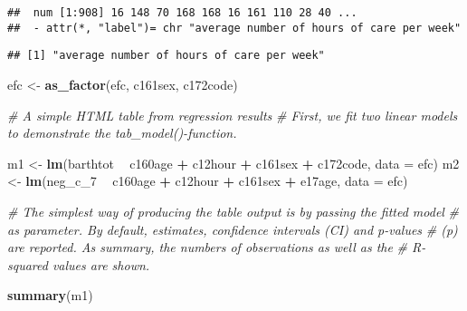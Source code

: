 \documentclass[]{article}
\newenvironment{Shaded}{\begin{snugshade}}{\end{snugshade}}
\newcommand{\KeywordTok}[1]{\textcolor[rgb]{0.13,0.29,0.53}{\textbf{#1}}}
\newcommand{\DataTypeTok}[1]{\textcolor[rgb]{0.13,0.29,0.53}{#1}}
\newcommand{\DecValTok}[1]{\textcolor[rgb]{0.00,0.00,0.81}{#1}}
\newcommand{\StringTok}[1]{\textcolor[rgb]{0.31,0.60,0.02}{#1}}
\newcommand{\CommentTok}[1]{\textcolor[rgb]{0.56,0.35,0.01}{\textit{#1}}}
\newcommand{\OperatorTok}[1]{\textcolor[rgb]{0.81,0.36,0.00}{\textbf{#1}}}
\newcommand{\NormalTok}[1]{#1}
\begin{document}
\begin{verbatim}
##  num [1:908] 16 148 70 168 168 16 161 110 28 40 ...
##  - attr(*, "label")= chr "average number of hours of care per week"
\end{verbatim}

\begin{Shaded}
\end{Shaded}

\begin{verbatim}
## [1] "average number of hours of care per week"
\end{verbatim}

\begin{Shaded}
\begin{Highlighting}[]
\NormalTok{efc <-}\StringTok{ }\KeywordTok{as_factor}\NormalTok{(efc, c161sex, c172code)}

\CommentTok{# A simple HTML table from regression results}
\CommentTok{# First, we fit two linear models to demonstrate the tab_model()-function.}

\NormalTok{m1 <-}\StringTok{ }\KeywordTok{lm}\NormalTok{(barthtot }\OperatorTok{~}\StringTok{ }\NormalTok{c160age }\OperatorTok{+}\StringTok{ }\NormalTok{c12hour }\OperatorTok{+}\StringTok{ }\NormalTok{c161sex }\OperatorTok{+}\StringTok{ }\NormalTok{c172code, }\DataTypeTok{data =}\NormalTok{ efc)}
\NormalTok{m2 <-}\StringTok{ }\KeywordTok{lm}\NormalTok{(neg_c_}\DecValTok{7} \OperatorTok{~}\StringTok{ }\NormalTok{c160age }\OperatorTok{+}\StringTok{ }\NormalTok{c12hour }\OperatorTok{+}\StringTok{ }\NormalTok{c161sex }\OperatorTok{+}\StringTok{ }\NormalTok{e17age, }\DataTypeTok{data =}\NormalTok{ efc)}

\CommentTok{# The simplest way of producing the table output is by passing the fitted model}
\CommentTok{# as parameter. By default, estimates, confidence intervals (CI) and p-values }
\CommentTok{# (p) are reported. As summary, the numbers of observations as well as the }
\CommentTok{# R-squared values are shown.}

\KeywordTok{summary}\NormalTok{(m1)}
\end{Highlighting}
\end{Shaded}
\end{document}
